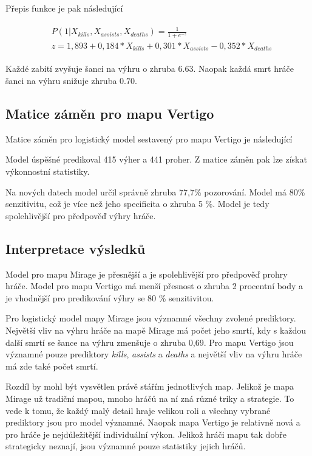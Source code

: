 

Přepis funkce je pak následující

\begin{align}
    \begin{split}
        &P(1 | X_{kills}, X_{assists}, X_{deaths}) = \frac{1}{1 + e^{-z}} \\
        &z = 1,893 + 0,184*X_{kills} + 0,301*X_{assists} - 0,352*X_{deaths}
    \end{split}
\end{align}

Každé zabití zvyšuje šanci na výhru o zhruba $6.63$. Naopak každá smrt hráče šanci na výhru snižuje zhruba $0.70$.

\newpage
\subsection{Matice záměn pro mapu Vertigo}
Matice záměn pro logistický model sestavený pro mapu Vertigo je následující



Model úspěšné predikoval 415 výher a 441 proher. Z matice záměn pak lze získat výkonnostní statistiky.



Na nových datech model určil správně zhruba 77,7\% pozorování. Model má 80\% senzitivitu, což je více než jeho specificita o zhruba 5 \%. Model je tedy spolehlivější
pro předpověď výhry hráče.

\subsection{Interpretace výsledků}
Model pro mapu Mirage je přesnější a je spolehlivější pro předpověď prohry hráče. Model pro mapu Vertigo má menší přesnost o zhruba 
2 procentní body a je vhodnější pro predikování výhry se 80 \% senzitivitou.

Pro logistický model mapy Mirage jsou významné všechny zvolené prediktory. Největší vliv na výhru hráče na mapě Mirage má počet jeho smrtí, kdy s každou další smrtí se šance
na výhru zmenšuje o zhruba 0,69. Pro mapu Vertigo jsou významné pouze prediktory \textit{kills}, \textit{assists} a \textit{deaths} a největší vliv na výhru hráče
má zde také počet smrtí.

Rozdíl by mohl být vysvětlen právě stářím jednotlivých map. Jelikož je mapa Mirage už tradiční mapou, mnoho hráčů na ní zná různé triky a strategie. To vede k tomu, že
každý malý detail hraje velikou roli a všechny vybrané prediktory jsou pro model významné. Naopak mapa Vertigo je relativně nová a pro hráče je nejdůležitější individuální
výkon. Jelikož hráči mapu tak dobře strategicky neznají, jsou významné pouze statistiky jejich hráčů.